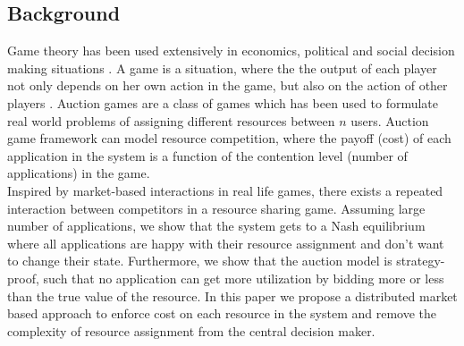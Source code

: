 \subsection{Background}
Game theory has been used extensively in economics, political and social decision making situations \cite{tootaghaj2011game, tootaghaj2011risk, kotobi2017spectrum, kotobi2015introduction, kesidis2013distributed, kurve2013agent, wang2017using, wang2015recouping}. A game is a situation, where the the output of each player not only depends on her own action in the game, but also on the action of other players \cite{osborne1994course}. Auction games are a class of games which has been used to formulate real world problems of assigning different resources between $n$ users. Auction game framework can model resource competition, where the payoff (cost) of each application in the system is a function of the contention level (number of applications) in the game.\\
\indent Inspired by market-based interactions in real life games, there exists a repeated interaction between competitors in a resource sharing game. Assuming large number of applications, we show that the system gets to a Nash equilibrium where all applications are happy with their resource assignment and don't want to change their state. Furthermore, we show that the auction model is strategy-proof, such that no application can get more utilization by bidding more or less than the true value of the resource. In this paper we propose a distributed market based approach to enforce cost on each resource in the system and remove the complexity of resource assignment from the central decision maker.\\ 
